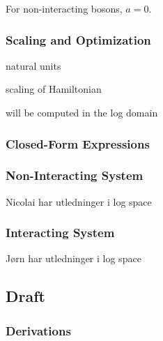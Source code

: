 For non-interacting bosons, $a=0$. 

\subsubsection{Scaling and Optimization}

natural units 

scaling of Hamiltonian

will be computed in the log domain

\subsubsection{Closed-Form Expressions}

\subsubsection*{Non-Interacting System}

Nicolai har utledninger i log space

\subsubsection*{Interacting System}

Jørn har utledninger i log space

\subsection{Draft}

\subsubsection*{Derivations}

